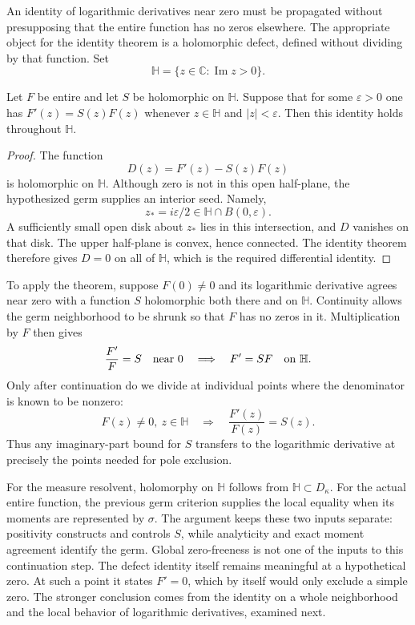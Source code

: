 \label{res:continuation}
An identity of logarithmic derivatives near zero must be propagated
without presupposing that the entire function has no zeros elsewhere.
The appropriate object for the identity theorem is a holomorphic
defect, defined without dividing by that function. Set
\[
 \mathbb H=\{z\in\mathbb C:\operatorname{Im}z>0\}.
\]
\begin{theorem}
Let $F$ be entire and let $S$ be holomorphic on $\mathbb H$.
Suppose that for some $\varepsilon>0$ one has
$F'(z)=S(z)F(z)$ whenever $z\in\mathbb H$ and $|z|<\varepsilon$.
Then this identity holds throughout $\mathbb H$.
\end{theorem}
\begin{proof}
The function
\[
 D(z)=F'(z)-S(z)F(z)
\]
is holomorphic on $\mathbb H$. Although zero is not in this open
half-plane, the hypothesized germ supplies an interior seed. Namely,
\[
 z_* = i\varepsilon/2\in\mathbb H\cap B(0,\varepsilon).
\]
A sufficiently small open disk about $z_*$ lies in this intersection,
and $D$ vanishes on that disk. The upper half-plane is convex, hence
connected. The identity theorem therefore gives $D=0$ on all of
$\mathbb H$, which is the required differential identity.
\end{proof}

To apply the theorem, suppose $F(0)\ne0$ and its logarithmic derivative
agrees near zero with a function $S$ holomorphic both there and on
$\mathbb H$. Continuity allows the germ neighborhood to be shrunk so
that $F$ has no zeros in it. Multiplication by $F$ then gives
\[
 \frac{F'}F=S\quad\hbox{near }0
 \quad\Longrightarrow\quad F'=SF\quad\hbox{on }\mathbb H.
\]
Only after continuation do we divide at individual points where the
denominator is known to be nonzero:
\[
 F(z)\ne0,\ z\in\mathbb H
 \quad\Longrightarrow\quad \frac{F'(z)}{F(z)}=S(z).
\]
Thus any imaginary-part bound for $S$ transfers to the logarithmic
derivative at precisely the points needed for pole exclusion.

For the measure resolvent, holomorphy on $\mathbb H$ follows from
$\mathbb H\subset D_\kappa$. For the actual entire function, the
previous germ criterion supplies the local equality when its moments
are represented by $\sigma$. The argument keeps these two inputs
separate: positivity constructs and controls $S$, while analyticity
and exact moment agreement identify the germ. Global zero-freeness is
not one of the inputs to this continuation step.
The defect identity itself remains meaningful at a hypothetical zero.
At such a point it states $F'=0$, which by itself would only exclude
a simple zero. The stronger conclusion comes from the identity on a
whole neighborhood and the local behavior of logarithmic derivatives,
examined next.

